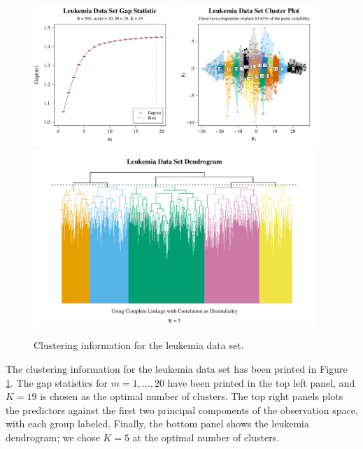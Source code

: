 \documentclass[11pt]{article}
\begin{document}
\begin{figure}[ht]
    \centering
    \includegraphics[width = 0.475\textwidth]{leuk_gap_stat.pdf}
    \includegraphics[width = 0.475\textwidth]{leuk_clus_plot.pdf}
    \includegraphics[width = 0.95\textwidth]{leuk_den.pdf}
    \caption{Clustering information for the leukemia data set.}
    \label{leukclus}
\end{figure}

The clustering information for the leukemia data set has been printed in Figure \ref{leukclus}. The gap statistics for $m = 1, \ldots, 20$ have been printed in the top left panel, and $K = 19$ is chosen as the optimal number of clusters. The top right panels plots the predictors against the first two principal components of the observation space, with each group labeled. Finally, the bottom panel shows the leukemia dendrogram; we chose $K = 5$ at the optimal number of clusters. 
\end{document}
